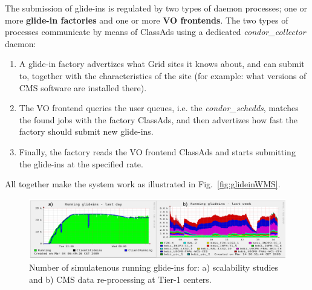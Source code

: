 \documentclass[a4paper]{jpconf}
\begin{document}
The submission of glide-ins is regulated by two types of daemon processes; 
one or more \textbf{glide-in factories} and one or more \textbf{VO frontends}. 
The two types of processes communicate by means of ClassAds using a dedicated \emph{condor\_collector} daemon:
\begin{enumerate}
\item A glide-in factory advertizes what Grid sites it knows about, and can submit to, together with the characteristics of the site 
(for example: what versions of CMS software are installed there).
\item The VO frontend queries the user queues, i.e. the \emph{condor\_schedds}, 
matches the found jobs with the factory ClassAds, 
and then advertizes how fast the factory should submit new glide-ins.
\item Finally, the factory reads the VO frontend ClassAds and starts submitting the glide-ins at the specified rate.
\end{enumerate}

All together make the system work as illustrated in Fig.~\ref{fig:glideinWMS}.
\begin{figure}
\begin{center}
\includegraphics[scale=0.55]{glideinT1stat}
\end{center}
\caption{Number of simulatenous running glide-ins for: a) scalability studies and b) CMS data re-processing at Tier-1 centers.}
\label{fig:glideinT1stat}
\end{figure}
\end{document}

